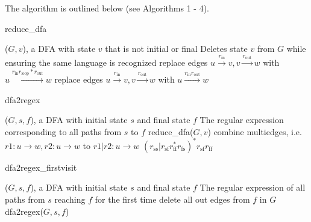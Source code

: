 \documentclass[preprint,12pt]{elsarticle}
\theoremstyle{definition}
\theoremstyle{remark}
\begin{document}
The algorithm is outlined below (see Algorithms 1 - 4). %

\begin{algorithm}[h!]
    \caption{reduce\_dfa}
    \begin{algorithmic}
        \Require ($G, v$), a DFA with state $v$ that is not initial or final
        \Ensure Deletes state $v$ from $G$ while ensuring the same language is recognized
                \State replace edges $u\xrightarrow{r_\mathrm{in}} v, v \xrightarrow{r_\mathrm{out}} w$ with $u \xrightarrow{r_\mathrm{in} r_\mathrm{loop}* r_\mathrm{out}} w$
            \Else
                \State replace edges $u\xrightarrow{r_\mathrm{in}} v, v \xrightarrow{r_\mathrm{out}} w$ with $u \xrightarrow{r_\mathrm{in}  r_\mathrm{out}} w$
            \EndIf
        \EndFor
    \end{algorithmic}
\end{algorithm}

\begin{algorithm}[h!]
    \caption{dfa2regex}
    \begin{algorithmic}
        \Require ($G, s, f$), a DFA with initial state $s$ and final state $f$
        \Ensure The regular expression corresponding to all paths from $s$ to $f$
            \State reduce\_dfa($G, v$)
            \State combine multiedges, i.e. $r1 : u \to w, r2 : u \to w$  to $r1 | r2 : u \to w$
        \EndWhile
        \State \Return $(r_\mathrm{ss}| r_\mathrm{sf} r_\mathrm{ff}^* r_\mathrm{fs})^* r_\mathrm{sf} r_\mathrm{ff}$
    \end{algorithmic}
\end{algorithm}

\begin{algorithm}[h!]
    \caption{dfa2regex\_firstvisit}
    \begin{algorithmic}
        \Require ($G, s, f$), a DFA with initial state $s$ and final state $f$
        \Ensure The regular expression of all paths from $s$ reaching $f$ for the first time
        \State delete all out edges from $f$ in $G$
        \State \Return dfa2regex($G, s, f$)
    \end{algorithmic}
\end{algorithm}
\end{document}
